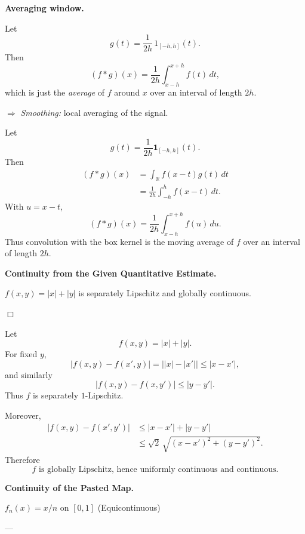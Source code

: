 \begin{problem}[CP-II-0392]
\label{prob:cp-ii-0392}
\textbf{Averaging window.}

\hspace*{1.5em}Let
\[
g(t) = \frac{1}{2h}\,1_{[-h,h]}(t).
\]
Then
\[
(f*g)(x)
= \frac{1}{2h} \int_{x-h}^{x+h} f(t)\,dt,
\]
which is just the \emph{average} of $f$ around $x$ over an interval of
length $2h$.

\medskip
\noindent$\Rightarrow$ \emph{Smoothing:} local averaging of the signal.

\bigskip
\bigskip
\end{problem}

\begin{solution}
Let
\[
g(t)=\frac1{2h}\mathbf1_{[-h,h]}(t).
\]
Then
\[
\begin{aligned}
(f*g)(x)
&=
\int_{\mathbb R}f(x-t)g(t)\,dt\\
&=
\frac1{2h}\int_{-h}^{h}f(x-t)\,dt.
\end{aligned}
\]
With \(u=x-t\),
\[
\boxed{
(f*g)(x)
=
\frac1{2h}\int_{x-h}^{x+h}f(u)\,du.
}
\]
Thus convolution with the box kernel is the moving average of \(f\) over an interval of
length \(2h\).
\end{solution}


\begin{problem}[CP-II-0394]
\label{prob:cp-ii-0394}
\textbf{Continuity from the Given Quantitative Estimate.}

\hspace*{1.5em}$f(x,y)=|x|+|y|$ is separately Lipschitz and globally continuous.

\hfill$\Box$
\end{problem}

\begin{solution}
Let
\[
f(x,y)=|x|+|y|.
\]
For fixed \(y\),
\[
|f(x,y)-f(x',y)|
=
\bigl||x|-|x'|\bigr|
\le|x-x'|,
\]
and similarly
\[
|f(x,y)-f(x,y')|
\le|y-y'|.
\]
Thus \(f\) is separately \(1\)-Lipschitz.

Moreover,
\[
\begin{aligned}
|f(x,y)-f(x',y')|
&\le
|x-x'|+|y-y'|\\
&\le
\sqrt2\,
\sqrt{(x-x')^2+(y-y')^2}.
\end{aligned}
\]
Therefore
\[
\boxed{
f\text{ is globally Lipschitz, hence uniformly continuous and continuous}.
}
\]
\end{solution}


\begin{problem}[CP-II-0397]
\label{prob:cp-ii-0397}
\textbf{Continuity of the Pasted Map.}

\hspace*{1.5em}$f_n(x)=x/n$ on $[0,1]$ (Equicontinuous)

---
\end{problem}

